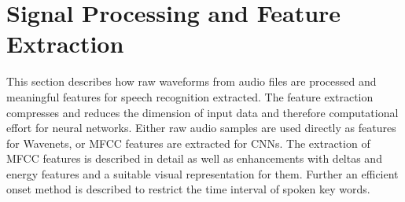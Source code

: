 
\chapter{Signal Processing and Feature Extraction}\label{sec:signal}
\thesisStateRevised
This section describes how raw waveforms from audio files are processed and meaningful features for speech recognition extracted.
The feature extraction compresses and reduces the dimension of input data and therefore computational effort for neural networks.
Either raw audio samples are used directly as features for Wavenets, or MFCC features are extracted for CNNs.
The extraction of MFCC features is described in detail as well as enhancements with deltas and energy features and a suitable visual representation for them.
Further an efficient onset method is described to restrict the time interval of spoken key words. 





